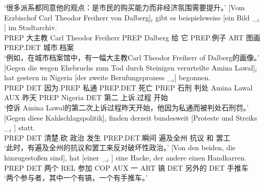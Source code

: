 \begin{sloppypar}
{}
\glt `很多派系都同意他的观点：是市民的购买能力而非经济氛围需要提升。'
\ex\label{bsp-von-erzbischof-bilder} 
\gll {}[Vom Erzbischof Carl Theodor Freiherr von Dalberg]$_i$ gibt es beispielsweise [ein Bild \_$_i$]
        im Stadtarchiv.\footnotemark\\
	{}\spacebr{}PREP 大主教 Carl Theodor Freiherr PREP Dalberg 给 它 PREP.例子 \spacebr{}ART 图画 {} PREP.DET 城市.档案\\
\glt `例如，在城市档案馆中，有一幅大主教Carl Theodor Freiherr of Dalberg的画像。'
\ex 
\gll {}[Gegen die wegen Ehebruchs zum Tod durch Steinigen verurteilte Amina Lawal]$_i$ hat gestern in Nigeria
    [der zweite Berufungsprozess \_$_i$] begonnen.\footnotemark\\
	{}\spacebr{}PREP DET 因为.PREP 私通 PREP.DET 死亡 PREP 石刑 判处 Amina Lawal AUX 昨天 PREP Nigeria \spacebr{}DET 第二 上诉.过程 {} 开始\\
\glt `控诉 Amina Lawal的第二次上诉过程昨天开始，他因为私通而被判处石刑罚。'
\ex 
\gll {}[Gegen diese Kahlschlagspolitik]$_i$ finden derzeit bundesweit [Proteste und Streiks \_$_i$ ] statt.\footnotemark\\
	 {}\spacebr{}PREP DET 清楚.砍 政治 发生 PREP.DET.瞬间 遍及全州 \spacebr{}抗议 和 罢工 {} {} \prt{}\\
\glt `此时，有遍及全州的抗议和罢工来反对破坏性政治。'
\ex 
\gll {}[Von den beiden, die hinzugestoßen sind], hat [einer        \_$_i$ ] eine Hacke, der andere einen Handkarren.\footnotemark\\
	 {}\spacebr{}PREP DET 两个 REL 参加 COP AUX \spacebr{}一 {}    {}  ART 镐   DET 另外的 DET 手推车\\
\glt `两个参与者，其中一个有镐，一个有手推车。'

\end{sloppypar}
